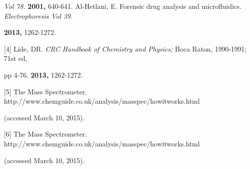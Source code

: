 \documentclass[12pt]{article}
\begin{document}
\hspace{12ex}\textit{Vol 78.} \textbf{2001,} 640-641.
\vspace{6pt}\newline
[3]\hspace{4ex} Al-Hetlani, E. Forensic drug analysis and microfluidics. \textit{Electrophoresis Vol 39.}

\hspace{12ex}\textbf{2013,} 1262-1272.

[4]\hspace{4ex} Lide, DR.\textit{ CRC Handbook of Chemistry and Physics;} Boca Raton, 1990-1991; 71st ed,

\hspace{12ex}pp 4-76.
\hspace{12ex}\textbf{2013,} 1262-1272.

[5]\hspace{4ex} The Mass Spectrometer. http://www.chemguide.co.uk/analysis/masspec/howitworks.html

\hspace{12ex}(accessed March 10, 2015).

[6]\hspace{4ex} The Mass Spectrometer. http://www.chemguide.co.uk/analysis/masspec/howitworks.html

\hspace{12ex}(accessed March 10, 2015).
\end{document}
